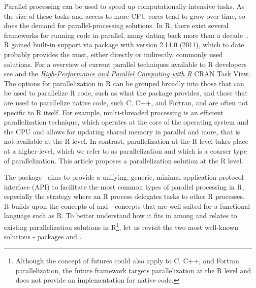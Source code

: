 Parallel processing can be used to speed up computationally intensive
tasks.  As the size of these tasks and access to more CPU cores tend
to grow over time, so does the demand for parallel-processing
solutions.  In R, there exist several frameworks for running code in
parallel, many dating back more than a
decade~\citep{Schmidberger2009}.  R gained built-in support
via  package with version 2.14.0 (2011), which to date
probably provides the most, either directly or indirectly, commonly
used solutions.  For a overview of current parallel techniques
available to R developers see \citet{Eddelbuettel2020} and the
\href{https://CRAN.R-project.org/view=HighPerformanceComputing}{\emph{High-Performance and Parallel Computing with R}} CRAN Task View.
%
The options for parallelization in R can be grouped broadly into those
that can be used to parallelize R code, such as what
the  package provides, and those that are used to
parallelize native code, such C, C++, and Fortran, and are often not
specific to R itself.  For example, multi-threaded processing is an
efficient parallelization technique, which operates at the core of the
operating system and the CPU and allows for updating shared memory in
parallel and more, that is not available at the R level.  In contrast,
parallelization at the R level takes place at a higher-level, which we
refer to as  parallelization and which is a coarser
type of parallelization.  This article proposes a parallelization
solution at the R level.

The  package~\citep{CRAN:future} aims to provide a
unifying, generic, minimal application protocol interface (API) to
facilitate the most common types of parallel processing in R,
especially the  strategy where an R process
delegates tasks to other R processes. It builds upon the concepts
of  \citep{HewittBaker_1977}
and  \citep{FriedmanWise_1978, Hibbard_1976} - concepts
that are well suited for a functional language such as R.
To better understand how it fits in among and relates to existing
parallelization solutions in R\footnote{Although the concept of
futures could also apply to C, C++, and Fortran parallelization, the
future framework targets parallelization at the R level and does not
provide an implementation for native code.}, let us revisit the two
most well-known solutions - packages 
and .

